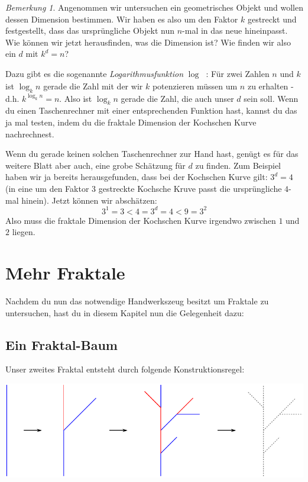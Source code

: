 \documentclass[a4paper,ngerman,12pt]{scrartcl}
\theoremstyle{definition}
\theoremstyle{plain}
\theoremstyle{remark}
\newtheorem{bem}[defn]{Bemerkung}
\begin{document}
\begin{bem}
Angenommen wir untersuchen ein geometrisches Objekt und wollen dessen Dimension bestimmen. Wir haben es also um den Faktor $k$ gestreckt und festgestellt, dass das ursprüngliche Objekt nun $n$-mal in das neue hineinpasst. Wie können wir jetzt herausfinden, was die Dimension ist? Wie finden wir also ein $d$ mit $k^d = n$?

Dazu gibt es die sogenannte \emph{Logarithmusfunktion} $\log_{\boxed{}}\boxed{\phantom{k}}$: Für zwei Zahlen $n$ und $k$ ist $\log_k n$ gerade die Zahl mit der wir $k$ potenzieren müssen um $n$ zu erhalten - d.h. $k^{\log_k n} = n$. Also ist $\log_k n$ gerade die Zahl, die auch unser $d$ sein soll. Wenn du einen Taschenrechner mit einer entsprechenden Funktion hast, kannst du das ja mal testen, indem du die fraktale Dimension der Kochschen Kurve nachrechnest.

Wenn du gerade keinen solchen Taschenrechner zur Hand hast, genügt es für das weitere Blatt aber auch, eine grobe Schätzung für $d$ zu finden. Zum Beispiel haben wir ja bereits herausgefunden, dass bei der Kochschen Kurve gilt: $3^d=4$ (in eine um den Faktor $3$ gestreckte Kochsche Kruve passt die ursprüngliche $4$-mal hinein). Jetzt können wir abschätzen:
\[3^1 = 3 < 4 = 3^d = 4 < 9 = 3^2\]
Also muss die fraktale Dimension der Kochschen Kurve irgendwo zwischen $1$ und $2$ liegen.
\end{bem}

\section{Mehr Fraktale}

Nachdem du nun das notwendige Handwerkszeug besitzt um Fraktale zu untersuchen, hast du in diesem Kapitel nun die Gelegenheit dazu:

\subsection{Ein Fraktal-Baum}

Unser zweites Fraktal entsteht durch folgende Konstruktionsregel:
\begin{center}
	\includegraphics[width=.7\textwidth]{Bilder/Baum-Konstruktion.pdf}
\end{center}
\end{document}
